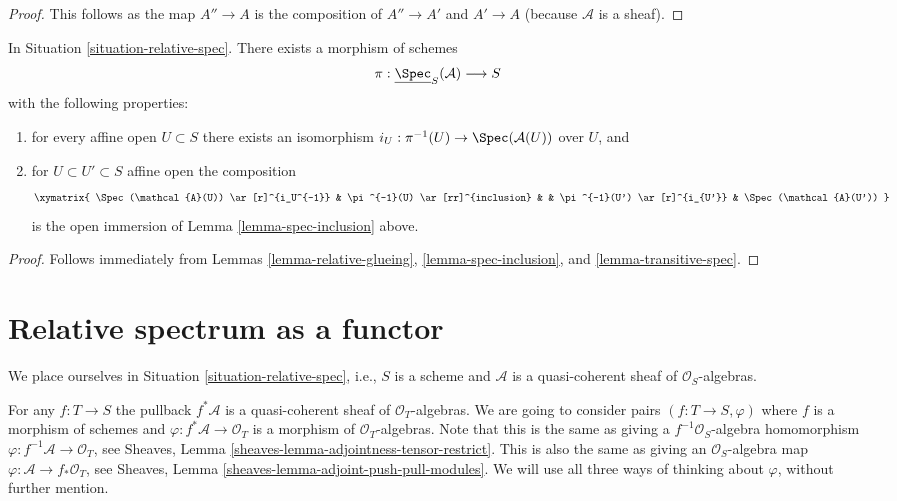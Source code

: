 \begin{proof}
This follows as the map $A'' \to A$ is the composition of $A'' \to A'$ and
$A' \to A$ (because $\mathcal{A}$ is a sheaf).
\end{proof}

\begin{lemma}
\label{lemma-glue-relative-spec}
In Situation \ref{situation-relative-spec}.
There exists a morphism of schemes
$$
\pi : \underline{\Spec}_S(\mathcal{A}) \longrightarrow S
$$
with the following properties:
\begin{enumerate}
\item for every affine open $U \subset S$ there exists an isomorphism
$i_U : \pi^{-1}(U) \to \Spec(\mathcal{A}(U))$ over $U$, and
\item for $U \subset U' \subset S$ affine open the composition
$$
\xymatrix{
\Spec(\mathcal{A}(U)) \ar[r]^{i_U^{-1}} &
\pi^{-1}(U) \ar[rr]^{inclusion} & &
\pi^{-1}(U') \ar[r]^{i_{U'}} &
\Spec(\mathcal{A}(U'))
}
$$
is the open immersion of Lemma \ref{lemma-spec-inclusion} above.
\end{enumerate}
\end{lemma}

\begin{proof}
Follows immediately from
Lemmas \ref{lemma-relative-glueing},
\ref{lemma-spec-inclusion}, and
\ref{lemma-transitive-spec}.
\end{proof}












\section{Relative spectrum as a functor}
\label{section-spec}

\noindent
We place ourselves in Situation \ref{situation-relative-spec}, i.e.,
$S$ is a scheme and $\mathcal{A}$ is a quasi-coherent sheaf of
$\mathcal{O}_S$-algebras.

\medskip\noindent
For any $f : T \to S$ the pullback
$f^*\mathcal{A}$ is a quasi-coherent sheaf of $\mathcal{O}_T$-algebras.
We are going to consider pairs $(f : T \to S, \varphi)$ where
$f$ is a morphism of schemes and $\varphi : f^*\mathcal{A} \to \mathcal{O}_T$
is a morphism of $\mathcal{O}_T$-algebras. Note that this is the
same as giving a $f^{-1}\mathcal{O}_S$-algebra homomorphism
$\varphi : f^{-1}\mathcal{A} \to \mathcal{O}_T$, see
Sheaves, Lemma \ref{sheaves-lemma-adjointness-tensor-restrict}.
This is also the same as giving an $\mathcal{O}_S$-algebra map
$\varphi : \mathcal{A} \to f_*\mathcal{O}_T$, see
Sheaves, Lemma \ref{sheaves-lemma-adjoint-push-pull-modules}.
We will use all three ways of thinking about $\varphi$,
without further mention.

